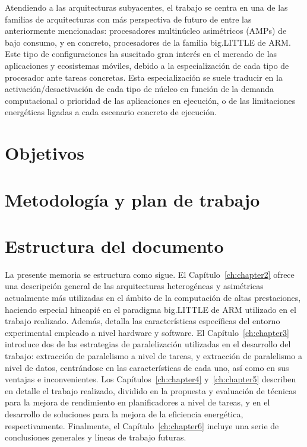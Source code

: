 Atendiendo a las arquitecturas subyacentes, el trabajo se centra en una de
las familias de arquitecturas con más perspectiva de futuro de entre las
anteriormente mencionadas: procesadores multinúcleo asimétricos (AMPs) de
bajo consumo, y en concreto, procesadores de la familia big.LITTLE de ARM.
Este tipo de configuraciones ha suscitado gran interés en el mercado de las
aplicaciones y ecosistemas móviles, debido a la especialización de cada
tipo de procesador ante tareas concretas. Esta especialización se suele
traducir en la activación/desactivación de cada tipo de núcleo en función
de la demanda computacional o prioridad de las aplicaciones en ejecución, o
de las limitaciones energéticas ligadas a cada escenario concreto de
ejecución.



\section{Objetivos}



\section{Metodología y plan de trabajo}

\section{Estructura del documento}

La presente memoria se estructura como sigue. 
El Capítulo~\ref{ch:chapter2} ofrece una descripción general de las arquitecturas heterogéneas
y asimétricas actualmente más utilizadas en el ámbito de la computación de altas prestaciones,
haciendo especial hincapié en el paradigma big.LITTLE de ARM utilizado en el trabajo realizado. Además,
detalla las características específicas del entorno experimental empleado a nivel hardware y software.
El Capítulo~\ref{ch:chapter3} introduce dos de las estrategias de paralelización utilizadas en el
desarrollo del trabajo: extracción de paralelismo a nivel de tareas, y extracción de paralelismo
a nivel de datos, centrándose en las características de cada uno, así como en sus ventajas e inconvenientes.
Los Capítulos~\ref{ch:chapter4} y~\ref{ch:chapter5} describen en detalle el trabajo realizado, dividido
en la propuesta y evaluación de técnicas para la mejora de rendimiento en planificadores a nivel de tareas,
y en el desarrollo de soluciones para la mejora de la eficiencia energética, respectivamente.
Finalmente, el Capítulo~\ref{ch:chapter6} incluye una serie de conclusiones generales y líneas
de trabajo futuras.


